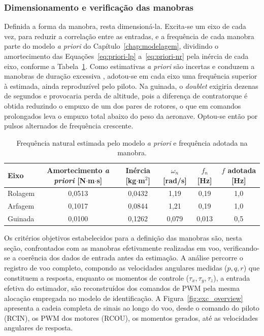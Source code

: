 {\color{blue}
\subsubsection{Dimensionamento e verificação das manobras}
\label{sec:manobras-realizadas}\label{sec:coerencia}

Definida a forma da manobra, resta dimensioná-la. Excita-se um eixo de cada vez, para reduzir a correlação entre as entradas, e a frequência de cada manobra parte do modelo \textit{a priori} do Capítulo~\ref{chap:modelagem}, dividindo o amortecimento das Equações~\eqref{eq:priori-lp} a~\eqref{eq:priori-nr} pela inércia de cada eixo, conforme a Tabela~\ref{tab:freq-priori}. Como estimativas \textit{a priori} são incertas e conduzem a manobras de duração excessiva \cite{Jategaonkar2015}, adotou-se em cada eixo uma frequência superior à estimada, ainda reproduzível pelo piloto. Na guinada, o \textit{doublet} exigiria dezenas de segundos e provocaria perda de altitude, pois a diferença de contratorque é obtida reduzindo o empuxo de um dos pares de rotores, o que em comandos prolongados leva o empuxo total abaixo do peso da aeronave. Optou-se então por pulsos alternados de frequência crescente.

\begin{table}[H]
\centering
\caption{\color{blue}Frequência natural estimada pelo modelo \textit{a priori} e frequência adotada na manobra.}
\label{tab:freq-priori}
\footnotesize\color{blue}
\begin{tabular}{l c c c c c}
\toprule
Eixo & Amortecimento \textit{a priori} [N$\cdot$m$\cdot$s] & Inércia [kg$\cdot$m$^2$] & $\omega_n$ [rad/s] & $f_n$ [Hz] & $f$ adotada [Hz] \\
\midrule
Rolagem & 0,0513 & 0,0432 & 1,19  & 0,19  & 1,0 \\
Arfagem & 0,1017 & 0,0844 & 1,21  & 0,19  & 1,0 \\
Guinada & 0,0100 & 0,1262 & 0,079 & 0,013 & 0,5 \\
\bottomrule
\end{tabular}
\end{table}

}

Os critérios objetivos estabelecidos para a definição das manobras são, nesta seção, confrontados com as manobras efetivamente realizadas em voo, verificando-se a coerência dos dados de entrada antes da estimação. A análise percorre o registro de voo completo, compondo as velocidades angulares medidas ($p,q,r$) que constituem a resposta, enquanto os momentos de controle ($\tau_x,\tau_y,\tau_z$), a entrada efetiva do estimador, são reconstruídos dos comandos de PWM pela mesma alocação empregada no modelo de identificação. A Figura~\ref{fig:exc_overview} apresenta a cadeia completa de sinais ao longo do voo, desde o comando do piloto (RCIN), os PWM dos motores (RCOU), os momentos gerados, até as velocidades angulares de resposta.

